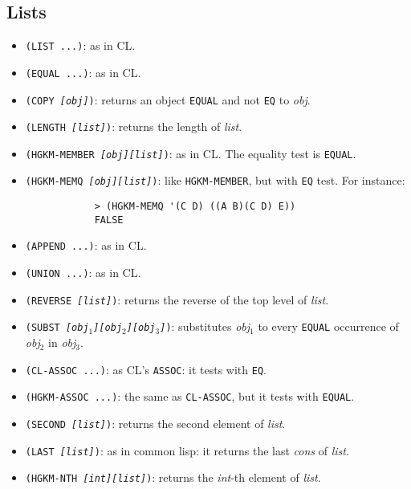 \subsection{Lists}

\begin{itemize}
   	\item {\tt (LIST ...)}:
        as in CL.
   	\item {\tt (EQUAL ...)}:
        as in CL.
   	\item {\tt (COPY {\it [obj]})}:
        returns an object {\tt EQUAL} and not  {\tt EQ} to {\it obj}.
    \item {\tt (LENGTH {\it [list]})}:
        returns the length of {\it list}.
    \item {\tt (HGKM-MEMBER {\it [obj][list]})}:
        as in CL.
		The equality test is {\tt EQUAL}.
    \item {\tt (HGKM-MEMQ {\it [obj][list]})}:
	    like {\tt HGKM-MEMBER}, but with {\tt EQ} test.
		For instance:
		\begin{verbatim}
			> (HGKM-MEMQ '(C D) ((A B)(C D) E))
			FALSE
		\end{verbatim}
    \item {\tt (APPEND ...)}:
        as in CL.
    \item {\tt (UNION ...)}:
        as in CL.
    \item {\tt (REVERSE {\it [list]})}:
        returns the reverse of the top level of {\it list}.
    \item {\tt (SUBST {\it [obj$_1$][obj$_2$][obj$_3$]})}:
        substitutes {\it obj$_1$} to every {\tt EQUAL} occurrence of
		{\it obj$_2$} in {\it obj$_3$}.
    \item {\tt (CL-ASSOC ...)}:
        as CL's {\tt ASSOC}: it tests with {\tt EQ}.
    \item {\tt (HGKM-ASSOC ...)}:
         the same as {\tt CL-ASSOC}, but it tests with {\tt EQUAL}.
    \item {\tt (SECOND {\it [list]})}:
         returns the second element of {\it list}.
    \item {\tt (LAST {\it [list]})}:
         as in common lisp: it returns the last {\em cons} of {\it list}.
    \item {\tt (HGKM-NTH {\it [int][list]})}:
        returns the {\it int}-th element of {\it list}.

\end{itemize}
